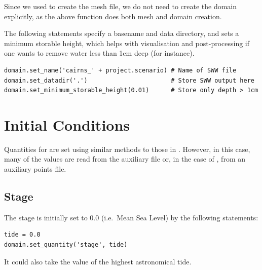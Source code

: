 \documentclass{manual}
\begin{document}
Since we used  to create the mesh file, we do not need to 
create the domain explicitly, as the above function does both mesh and domain creation.

The following statements specify a basename and data directory, and
sets a minimum storable height, which helps with visualisation and post-processing
if one wants to remove water less than 1cm deep (for instance).

\begin{verbatim}
domain.set_name('cairns_' + project.scenario) # Name of SWW file
domain.set_datadir('.')                       # Store SWW output here
domain.set_minimum_storable_height(0.01)      # Store only depth > 1cm
\end{verbatim}

\section{Initial Conditions}

Quantities for  are set
using similar methods to those in . However,
in this case, many of the values are read from the auxiliary file
 or, in the case of , from an
auxiliary points file.

\subsection{Stage}

The stage is initially set to 0.0 (i.e.\ Mean Sea Level) by the following statements:

\begin{verbatim}
tide = 0.0
domain.set_quantity('stage', tide)
\end{verbatim}

It could also take the value of the highest astronomical tide.


\end{document}
